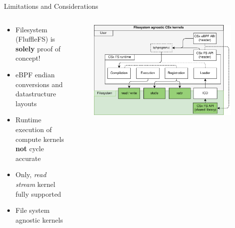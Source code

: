 \documentclass[aspectratio=169, notes]{beamer}
\begin{document}
\begin{frame}{Limitations and Considerations}
    \begin{columns}
        \begin{column}{0.50\textwidth}
            \footnotesize
            \begin{itemize}
                \item Filesystem (FluffleFS) is \textbf{solely} proof of
                      concept!
                \item eBPF endian conversions and datastructure layouts
                \item Runtime execution of compute kernels \textbf{not}
                      cycle accurate
                \item Only, \textit{read stream} kernel fully supported
                \item File system agnostic kernels
            \end{itemize}
            \textit{}
        \end{column}
        \begin{column}{0.50\textwidth}
            \begingroup
            \small
            \begin{figure}
                \centering
                \includegraphics[width=1\textwidth]{resources/images/csx-fs-agnostic.png}
            \end{figure}
            \endgroup
        \end{column}
    \end{columns}
\end{frame}
\end{document}
